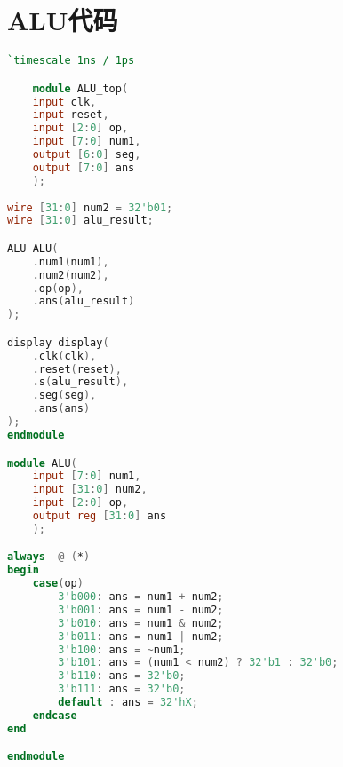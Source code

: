 \appendix
\section{ALU代码}

\begin{lstlisting}[language=Verilog]
    `timescale 1ns / 1ps

    module ALU_top(
    input clk,
    input reset,
    input [2:0] op,
    input [7:0] num1,
    output [6:0] seg,
    output [7:0] ans
    );
    
wire [31:0] num2 = 32'b01;
wire [31:0] alu_result;

ALU ALU(
    .num1(num1),
    .num2(num2),
    .op(op),
    .ans(alu_result)
);

display display(
    .clk(clk),
    .reset(reset),
    .s(alu_result),
    .seg(seg),
    .ans(ans)
);
endmodule

module ALU(
    input [7:0] num1,
    input [31:0] num2,
    input [2:0] op,
    output reg [31:0] ans
    );

always  @ (*) 
begin
    case(op)
        3'b000: ans = num1 + num2;
        3'b001: ans = num1 - num2;
        3'b010: ans = num1 & num2;
        3'b011: ans = num1 | num2;
        3'b100: ans = ~num1;
        3'b101: ans = (num1 < num2) ? 32'b1 : 32'b0;
        3'b110: ans = 32'b0;
        3'b111: ans = 32'b0;
        default : ans = 32'hX;
    endcase
end

endmodule


    
\end{lstlisting}

